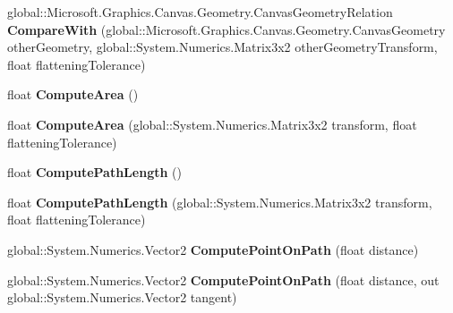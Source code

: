 \begin{DoxyCompactItemize}
global\+::\+Microsoft.\+Graphics.\+Canvas.\+Geometry.\+Canvas\+Geometry\+Relation {\bfseries Compare\+With} (global\+::\+Microsoft.\+Graphics.\+Canvas.\+Geometry.\+Canvas\+Geometry other\+Geometry, global\+::\+System.\+Numerics.\+Matrix3x2 other\+Geometry\+Transform, float flattening\+Tolerance)
\item 
\mbox{\label{interface_microsoft_1_1_graphics_1_1_canvas_1_1_geometry_1_1_i_canvas_geometry_a0f5c0e7cc934073f79ef8689581c700e}} 
float {\bfseries Compute\+Area} ()
\item 
\mbox{\label{interface_microsoft_1_1_graphics_1_1_canvas_1_1_geometry_1_1_i_canvas_geometry_abccc0c3b05f197af6abf2a494662b435}} 
float {\bfseries Compute\+Area} (global\+::\+System.\+Numerics.\+Matrix3x2 transform, float flattening\+Tolerance)
\item 
\mbox{\label{interface_microsoft_1_1_graphics_1_1_canvas_1_1_geometry_1_1_i_canvas_geometry_a7b9a9d62779c0ffb9edae6b37d603e83}} 
float {\bfseries Compute\+Path\+Length} ()
\item 
\mbox{\label{interface_microsoft_1_1_graphics_1_1_canvas_1_1_geometry_1_1_i_canvas_geometry_a86d3efebb758fbccdb757cae6bd3be83}} 
float {\bfseries Compute\+Path\+Length} (global\+::\+System.\+Numerics.\+Matrix3x2 transform, float flattening\+Tolerance)
\item 
\mbox{\label{interface_microsoft_1_1_graphics_1_1_canvas_1_1_geometry_1_1_i_canvas_geometry_a8d6d3c32929175715f13de9f723e337c}} 
global\+::\+System.\+Numerics.\+Vector2 {\bfseries Compute\+Point\+On\+Path} (float distance)
\item 
\mbox{\label{interface_microsoft_1_1_graphics_1_1_canvas_1_1_geometry_1_1_i_canvas_geometry_a294f3ceb3a3cc6a0a96a5a902d21cb7a}} 
global\+::\+System.\+Numerics.\+Vector2 {\bfseries Compute\+Point\+On\+Path} (float distance, out global\+::\+System.\+Numerics.\+Vector2 tangent)

\end{DoxyCompactItemize}
